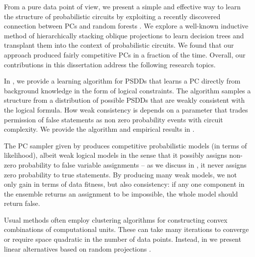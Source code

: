 From a pure data point of view, we present a simple and effective way to learn the structure of
probabilistic circuits by exploiting a recently discovered connection between PCs and random
forests \citep{correia20}. We explore a well-known inductive method of hierarchically stacking
oblique projections to learn decision trees \citep{dasgupta08a,dasgupta08b} and transplant them
into the context of probabilistic circuits. We found that our approach produced fairly competitive
PCs in a fraction of the time. Overall, our contributions in this dissertation address the
following research topics.


In \citet{geh21a}, we provide a learning algorithm for PSDDs that learns a PC directly from
background knowledge in the form of logical constraints. The algorithm samples a structure from a
distribution of possible PSDDs that are weakly consistent with the logical formula. How weak
consistency is depends on a parameter that trades permission of false statements as non zero
probability events with circuit complexity. We provide the algorithm and empirical results in
.


The PC sampler given by \citet{geh21a} produces competitive probabilistic models (in terms of
likelihood), albeit weak logical models in the sense that it possibly assigns non-zero probability
to false variable assignments -- as we discuss in , it never assigns zero
probability to true statements. By producing many weak models, we not only gain in terms of data
fitness, but also consistency: if any one component in the ensemble returns an assignment to be
impossible, the whole model should return false.


Usual methods often employ clustering algorithms for constructing convex combinations of
computational units. These can take many iterations to converge or require space quadratic in the
number of data points. Instead, in  we present linear alternatives based on random
projections \citep{dasgupta08a,dasgupta08b}.

